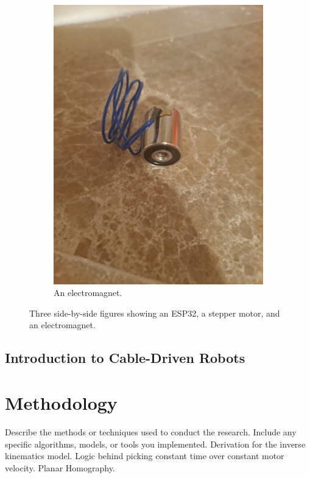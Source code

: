 \documentclass[11pt]{article}
\begin{document}
\begin{figure}[h!]
\begin{subfigure}[b]{0.3\textwidth}
    \includegraphics[width=\textwidth]{ElectromagnetImg.jpg}
    \caption{An electromagnet.}
    \label{fig:figure3}
\end{subfigure}

\caption{Three side-by-side figures showing an ESP32, a stepper motor, and an electromagnet.}
\label{fig:side_by_side}
\end{figure}
  


\subsection{Introduction to Cable-Driven Robots}

\section{Methodology}
Describe the methods or techniques used to conduct the research. Include any specific algorithms, models, or tools you implemented.
Derivation for the inverse kinematics model.
Logic behind picking constant time over constant motor velocity.
Planar Homography.
\end{document}
